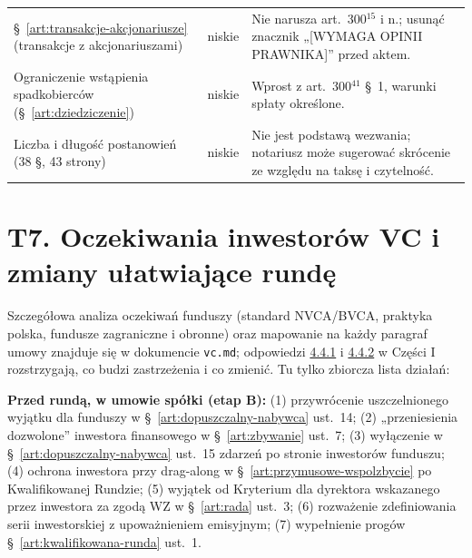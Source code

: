 \documentclass[12pt,a4paper]{report}
\newcounter{paragraf}
\begin{document}
\begin{longtable}{@{}p{4.0cm} p{1.9cm} p{8.3cm}@{}}
§~\ref{art:transakcje-akcjonariusze} (transakcje z akcjonariuszami) & niskie & Nie narusza art.~300$^{15}$ i n.; usunąć znacznik „[WYMAGA OPINII PRAWNIKA]” przed aktem. \\
Ograniczenie wstąpienia spadkobierców (§~\ref{art:dziedziczenie}) & niskie & Wprost z art.~300$^{41}$ §~1, warunki spłaty określone. \\
Liczba i długość postanowień (38 §, 43 strony) & niskie & Nie jest podstawą wezwania; notariusz może sugerować skrócenie ze względu na taksę i czytelność. \\
\bottomrule
\end{longtable}

\section*{T7. Oczekiwania inwestorów VC i zmiany ułatwiające rundę}

Szczegółowa analiza oczekiwań funduszy (standard NVCA/BVCA, praktyka polska, fundusze zagraniczne i obronne) oraz mapowanie na każdy paragraf umowy znajduje się w dokumencie \texttt{vc.md}; odpowiedzi \hyperref[memo:4.4.1]{4.4.1} i \hyperref[memo:4.4.2]{4.4.2} w Części I rozstrzygają, co budzi zastrzeżenia i co zmienić. Tu tylko zbiorcza lista działań:

\textbf{Przed rundą, w umowie spółki (etap B):} (1) przywrócenie uszczelnionego wyjątku dla funduszy w §~\ref{art:dopuszczalny-nabywca} ust.~14; (2) „przeniesienia dozwolone” inwestora finansowego w §~\ref{art:zbywanie} ust.~7; (3) wyłączenie w §~\ref{art:dopuszczalny-nabywca} ust.~15 zdarzeń po stronie inwestorów funduszu; (4) ochrona inwestora przy drag-along w §~\ref{art:przymusowe-wspolzbycie} po Kwalifikowanej Rundzie; (5) wyjątek od Kryterium dla dyrektora wskazanego przez inwestora za zgodą WZ w §~\ref{art:rada} ust.~3; (6) rozważenie zdefiniowania serii inwestorskiej z upoważnieniem emisyjnym; (7) wypełnienie progów §~\ref{art:kwalifikowana-runda} ust.~1.
\end{document}
